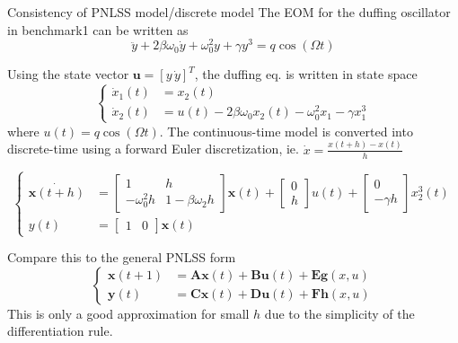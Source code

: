 \documentclass[9pt]{beamer}
\newcommand{\vect}[1]{\mathbf{#1}}
\begin{document}
\begin{frame}{Consistency of PNLSS model/discrete model}
  The EOM for the duffing oscillator in benchmark1 can be written as
  \begin{equation}
    \label{eq:duffing}
    \ddot y + 2\beta\omega_0\dot y + \omega_0^2 y + \gamma y^3 = q\cos(\Omega t)
  \end{equation}

  Using the state vector $\vect u = [y\,\dot y]^T $, the duffing eq. is written in state space
  \begin{equation}
    \label{eq:duffing_ss_ct}
    \left\lbrace
      \begin{aligned}
        \dot x_1(t) &= x_2(t) \\
        \dot x_2(t) &= u(t) - 2\beta\omega_0x_2(t) - \omega_0^2x_1 - \gamma x_1^3
      \end{aligned}
    \right.
  \end{equation}
  where $u(t)=q\cos(\Omega t)$. The continuous-time model is converted into
  discrete-time using a forward Euler discretization, ie. $\dot x =
  \frac{x(t+h)-x(t)}{h}$

  \begin{equation}
    \label{eq:duffing_ss_dt}
    \left\lbrace
      \begin{aligned}
        \dot{\vect x(t+h)} &=
        \begin{bmatrix}
          1 & h \\ -\omega_0^2h & 1-\beta\omega_2h
        \end{bmatrix} \vect x(t) +
        \begin{bmatrix}
          0 \\ h
        \end{bmatrix} u(t) +
        \begin{bmatrix}
          0 \\ -\gamma h
        \end{bmatrix} x_2^3(t) \\
        y(t) &=
        \begin{bmatrix}
          1 & 0
        \end{bmatrix} \vect x(t)
      \end{aligned}
    \right.
  \end{equation}

  Compare this to the general PNLSS form
  \begin{equation}
    \label{eq:pnlss}
    \left\lbrace
      \begin{aligned}
        \vect x(t+1) &= \vect A \vect x(t) + \vect B \vect u(t) + \vect E \vect g(x,u) \\
        \vect y(t) &= \vect C \vect x(t) + \vect D \vect u(t) + \vect F \vect h(x,u)
      \end{aligned}
    \right.
  \end{equation}
  This is only a good approximation for small $h$ due to the simplicity of the
  differentiation rule.
\end{frame}
\end{document}
